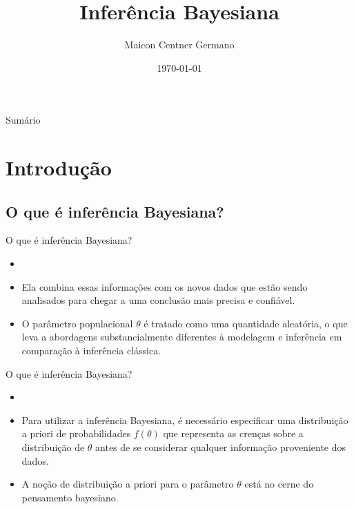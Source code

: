 \documentclass{beamer}
\title{Inferência Bayesiana}
\author{Maicon Centner Germano}
\institute{IBB UNESP}
\date{\today}
\begin{document}
\begin{frame}
  \titlepage
\end{frame}

\begin{frame}{Sumário}
  \tableofcontents
\end{frame}

\section{Introdução}

\subsection{O que é inferência Bayesiana?}
\begin{frame}{O que é inferência Bayesiana?}
\begin{itemize}
\item {}
\vspace{0.2cm}
\item Ela combina essas informações com os novos dados que estão sendo analisados para chegar a uma conclusão mais precisa e confiável.
\vspace{0.2cm}
\item O parâmetro populacional $\theta$ é tratado como uma quantidade aleatória, o que leva a abordagens substancialmente diferentes à modelagem e inferência em comparação à inferência clássica.
\end{itemize}
\end{frame}

\begin{frame}{O que é inferência Bayesiana?}
\begin{itemize}
\item {}
\vspace{0.2cm}
\item Para utilizar a inferência Bayesiana, é necessário especificar uma distribuição a priori de probabilidades $f(\theta)$ que representa as crenças sobre a distribuição de $\theta$ antes de se considerar qualquer informação proveniente dos dados.
\vspace{0.2cm}
\item A noção de distribuição a priori para o parâmetro $\theta$ está no cerne do pensamento bayesiano.

\end{itemize}
    
\end{frame}
\end{document}
